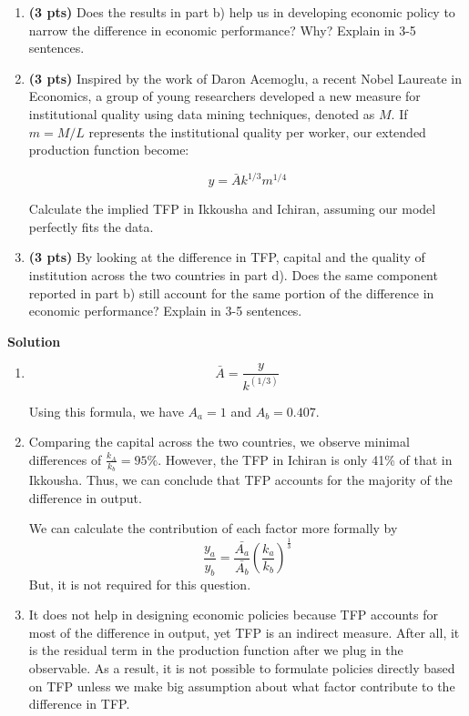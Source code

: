 \documentclass[14pt, oneside]{memoir}
\begin{document}
\begin{enumerate}[label=\textbf{\arabic*.}, itemsep=15pt]
\begin{enumerate}[label=(\alph*)]
	\vspace{8cm}
	\item \textbf{(3 pts)} Does the results in part b) help us in developing economic policy to narrow the difference in economic performance? Why? Explain in 3-5 sentences.
	
	\clearpage
	\item \textbf{(3 pts)} Inspired by the work of Daron Acemoglu, a recent Nobel Laureate in Economics, a group of young researchers developed a new measure for institutional quality using data mining techniques, denoted as \( M \). If \( m = M/L \) represents the institutional quality per worker, our extended production function become:
	
	\[
	y = \bar{A} k^{1/3} m^{1/4}
	\]
	
	Calculate the implied TFP in Ikkousha and Ichiran, assuming our model perfectly fits the data.
	
	\vspace{5cm}
	\item \textbf{(3 pts)} By looking at the difference in TFP, capital and the quality of institution across the two countries in part d). Does the same component reported in part b) still account for the same portion of the difference in economic performance? Explain in 3-5 sentences.
\end{enumerate}

\clearpage

\clearpage
\textbf{Solution}
\begin{enumerate}[label=(\alph*)]
	\item 
	\[\bar{A} = \frac{y}{k^(1/3)}\]
	
	Using this formula, we have $A_a = 1$ and $A_b = 0.407$.
	
	\item 
	Comparing the capital across the two countries, we observe minimal differences of $\frac{k_A}{k_b} = 95\%$. However, the TFP in Ichiran is only 41\% of that in Ikkousha. Thus, we can conclude that TFP accounts for the majority of the difference in output.
	
	We can calculate the contribution of each factor more formally by 
	\[\frac{y_a}{y_b} = \frac{\bar{A_a}}{\bar{A_b}} \left(\frac{k_a}{k_b}\right)^{\frac{1}{3}}\]
	But, it is not required for this question. 
	
	\item It does not help in designing economic policies because TFP accounts for most of the difference in output, yet TFP is an indirect measure. After all, it is the residual term in the production function after we plug in the observable.  As a result, it is not possible to formulate policies directly based on TFP unless we make big assumption about what factor contribute to the difference in TFP. 
	

\end{enumerate}
\end{enumerate}
\end{document}
